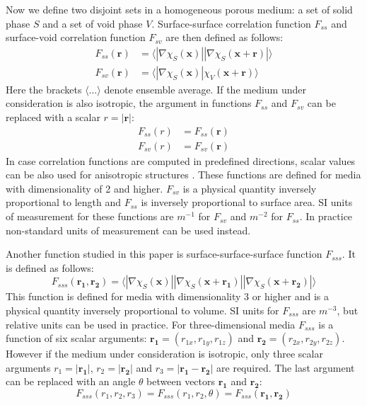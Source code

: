 \documentclass[reprint,amsmath,amssymb,aps,pre,showkeys,showpacs]{revtex4-1}
\begin{document}
Now we define two disjoint sets in a homogeneous porous medium: a set of solid
phase $S$ and a set of void phase $V$. Surface-surface correlation function
$F_{ss}$ and surface-void correlation function $F_{sv}$ are then defined as
follows:
\begin{align}
  F_{ss}(\bm{r}) &= \langle |\nabla \chi_S(\bm{x})| |\nabla \chi_S(\bm{x} +
  \bm{r})| \rangle \label{eq:fss} \\
  F_{sv}(\bm{r}) &= \langle |\nabla \chi_S(\bm{x})| \chi_V(\bm{x} +
  \bm{r}) \rangle \label{eq:fsv}
\end{align}
Here the brackets $\langle \dots \rangle$ denote ensemble average. If the medium
under consideration is also isotropic, the argument in functions $F_{ss}$ and
$F_{sv}$ can be replaced with a scalar $r = |\bm{r}|$:
\begin{align*}
  F_{ss}(r) &= F_{ss}(\bm{r}) \\
  F_{sv}(r) &= F_{sv}(\bm{r})
\end{align*}
In case correlation functions are computed in predefined directions, scalar
values can be also used for anisotropic structures
\cite{jiao2014chawla,EPL1}. These functions are defined for media with
dimensionality of 2 and higher. $F_{sv}$ is a physical quantity inversely
proportional to length and $F_{ss}$ is inversely proportional to surface
area. SI units of measurement for these functions are $m^{-1}$ for $F_{sv}$
and $m^{-2}$ for $F_{ss}$. In practice non-standard units of measurement can be
used instead.

Another function studied in this paper is surface-surface-surface function
$F_{sss}$. It is defined as follows:
\begin{equation}
  F_{sss}(\bm{r_1}, \bm{r_2}) = \langle |\nabla \chi_S(\bm{x})|
  |\nabla \chi_S(\bm{x} + \bm{r_1})|
  |\nabla \chi_S(\bm{x} + \bm{r_2})|
  \rangle \label{eq:fsss}
\end{equation}
This function is defined for media with dimensionality 3 or higher and is a
physical quantity inversely proportional to volume. SI units for $F_{sss}$ are
$m^{-3}$, but relative units can be used in practice. For three-dimensional media
$F_{sss}$ is a function of six scalar arguments:
$\bm{r_1} = (r_{1x}, r_{1y}, r_{1z})$ and $\bm{r_2} = (r_{2x}, r_{2y}, r_{2z})$.
However if the medium under consideration is isotropic, only three scalar
arguments $r_1 = |\bm{r_1}|$, $r_2 = |\bm{r_2}|$ and $r_3 = |\bm{r_1} - \bm{r_2}|$
are required. The last argument can be replaced with an angle $\theta$ between
vectors $\bm{r_1}$ and $\bm{r_2}$:
\begin{equation*}
  F_{sss}(r_1, r_2, r_3) = F_{sss}(r_1, r_2, \theta) = F_{sss}(\bm{r_1}, \bm{r_2})
\end{equation*}
\end{document}
